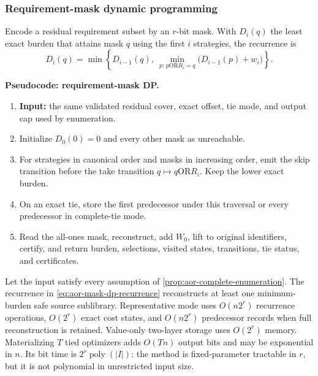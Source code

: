 \subsubsection{Requirement-mask dynamic programming}

Encode a residual requirement subset by an \(r\)-bit mask.  With
\(D_i(q)\) the least exact burden that attains mask \(q\) using the first
\(i\) strategies, the recurrence is
\begin{equation}
 D_i(q)=\min\left\{
 D_{i-1}(q),\
 \min_{p:\,p\mathbin{\mathrm{OR}}R_i=q}
      \bigl(D_{i-1}(p)+w_i\bigr)
 \right\}.
 \label{eq:aor-mask-dp-recurrence}
\end{equation}

\noindent\textbf{Pseudocode: requirement-mask DP.}
\begin{enumerate}
 \item \textbf{Input:} the same validated residual cover, exact offset, tie
       mode, and output cap used by enumeration.
 \item Initialize \(D_0(0)=0\) and every other mask as unreachable.
 \item For strategies in canonical order and masks in increasing order, emit
       the skip transition before the take transition
       \(q\mapsto q\mathbin{\mathrm{OR}}R_i\).  Keep the lower exact burden.
 \item On an exact tie, store the first predecessor under this traversal or
       every predecessor in complete-tie mode.
 \item Read the all-ones mask, reconstruct, add \(W_0\), lift to original
       identifiers, certify, and return burden, selections, visited states,
       transitions, tie status, and certificates.
\end{enumerate}

\begin{theorem}
\label{thm:aor-requirement-mask-dp}
Let the input satisfy every assumption of
\cref{prop:aor-complete-enumeration}.  The recurrence in
\eqref{eq:aor-mask-dp-recurrence} reconstructs at least one minimum-burden safe
source sublibrary.  Representative mode uses \(O(n2^r)\) recurrence operations,
\(O(2^r)\) exact cost states, and \(O(n2^r)\) predecessor records when full
reconstruction is retained.  Value-only two-layer storage uses \(O(2^r)\)
memory.  Materializing \(T\) tied optimizers adds \(O(Tn)\) output bits and may
be exponential in \(n\).  Its bit time is
\(2^r\operatorname{poly}(|I|)\): the method is fixed-parameter tractable in
\(r\), but it is not polynomial in unrestricted input size.
\end{theorem}

